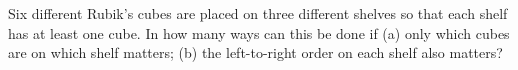 Six different Rubik's cubes are placed on three different shelves so that each shelf has at least one cube. In how many ways can this be done if (a) only which cubes are on which shelf matters; (b) the left-to-right order on each shelf also matters?
